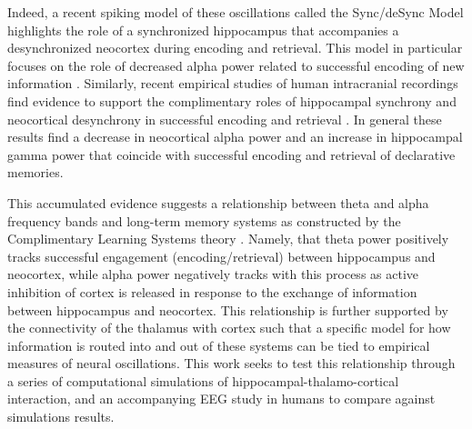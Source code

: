 \documentclass[11pt, titlepage, twoside]{article}
\begin{document}
Indeed, a recent spiking model of these oscillations called the Sync/deSync Model highlights the role of a synchronized hippocampus that accompanies a desynchronized neocortex during encoding and retrieval.  This model in particular focuses on the role of decreased alpha power related to successful encoding of new information \cite{ParishHanslmayrBowman18, HanslmayrStaresinaBowman16}.  Similarly, recent empirical studies of human intracranial recordings find evidence to support the complimentary roles of hippocampal synchrony and neocortical desynchrony in successful encoding and retrieval \cite{GriffithsMichelmannRouxEtAl18, StaresinaMichelmannBonnefondEtAl16}.  In general these results find a decrease in neocortical alpha power and an increase in hippocampal gamma power that coincide with successful encoding and retrieval of declarative memories. 


This accumulated evidence suggests a relationship between theta and alpha frequency bands and long-term memory systems as constructed by the Complimentary Learning Systems theory \cite{McClellandMcNaughtonOReilly95,OReillyBhattacharyyaHowardEtAl14}.  Namely, that theta power positively tracks successful engagement (encoding/retrieval) between hippocampus and neocortex, while alpha power negatively tracks with this process as active inhibition of cortex is released in response to the exchange of information between hippocampus and neocortex.  This relationship is further supported by the connectivity of the thalamus with cortex such that a specific model for how information is routed into and out of these systems can be tied to empirical measures of neural oscillations.  This work seeks to test this relationship through a series of computational simulations of hippocampal-thalamo-cortical interaction, and an accompanying EEG study in humans to compare against simulations results.
\end{document}
